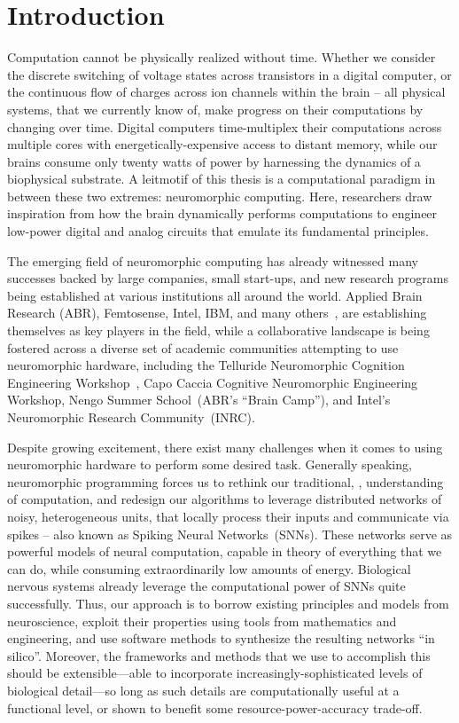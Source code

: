 
\chapter{Introduction}

Computation cannot be physically realized without time.
Whether we consider the discrete switching of voltage states across transistors in a
digital computer,
or the continuous flow of charges across ion channels within the brain -- 
all physical systems, that we currently know of, make progress on their computations
by changing over time.
Digital computers time-multiplex their computations across multiple cores with energetically-expensive access to distant memory, while our brains consume only twenty watts of power by harnessing the dynamics of a biophysical substrate.
A leitmotif of this thesis is a computational paradigm
in between these two extremes: neuromorphic computing.
Here, researchers draw inspiration from how the
brain dynamically performs computations
to engineer low-power digital and analog circuits that emulate its fundamental principles.

The emerging field of neuromorphic computing has already
witnessed many successes backed by large companies, small start-ups, and new research
programs being established at various institutions all around the world.
Applied Brain Research (ABR), Femtosense, Intel, IBM, and many others~\citep{marketreport2018}, are establishing themselves as key players in the field, while a collaborative landscape is being fostered across a diverse set of academic communities attempting to use neuromorphic hardware, including the Telluride Neuromorphic Cognition Engineering Workshop~\citep{cohen2001report}, Capo Caccia Cognitive Neuromorphic Engineering Workshop, Nengo Summer School~(ABR's ``Brain Camp''), and Intel's Neuromorphic Research Community~(INRC).

Despite growing excitement, there exist many challenges when it comes to using
neuromorphic hardware to perform some desired task.
Generally speaking, neuromorphic programming forces us to rethink our traditional,
\citet{von1958}, understanding of computation, and redesign our algorithms to leverage distributed networks of noisy, heterogeneous units, that locally process their inputs and communicate via spikes -- also known as Spiking Neural Networks~(SNNs).
These networks serve as powerful models of neural computation, capable in theory of everything that we can do, while consuming extraordinarily low amounts of energy.
Biological nervous systems already leverage the computational power of SNNs quite successfully.
Thus, our approach is to borrow existing
principles and models from neuroscience, exploit their properties using tools from mathematics and engineering,
and use software methods to synthesize the resulting networks ``in silico''.
Moreover, the frameworks and methods that we use to accomplish this should be extensible---able to incorporate increasingly-sophisticated levels of biological detail---so long as such details are computationally useful at a functional level, or shown to benefit some resource-power-accuracy trade-off.

